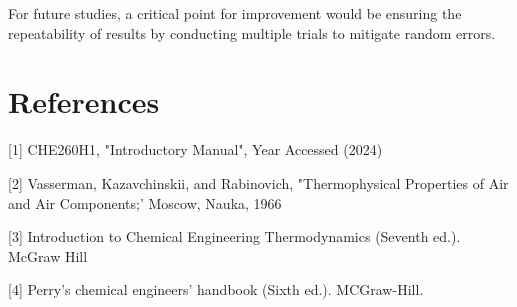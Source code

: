 \documentclass[titlepage, twocolumn, 12pt]{article}
\begin{document}
For future studies, a critical point for improvement would be ensuring the repeatability of results by conducting multiple trials to mitigate random errors. 

\section{References}

[1] CHE260H1, "Introductory Manual", Year Accessed (2024)


[2] Vasserman, Kazavchinskii, and Rabinovich, "Thermophysical Properties of Air and Air Components;' Moscow, Nauka, 1966 


[3] Introduction to Chemical Engineering Thermodynamics (Seventh ed.). McGraw Hill 

[4] Perry's chemical engineers' handbook (Sixth ed.). MCGraw-Hill.
\end{document}

